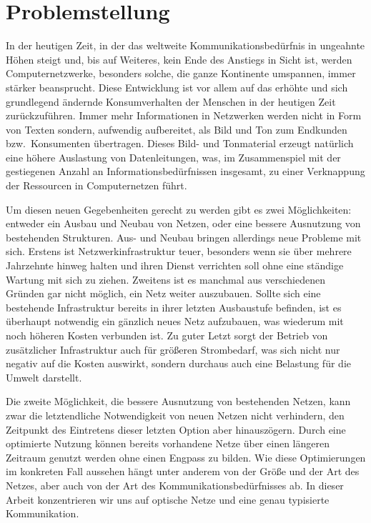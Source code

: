 \chapter{Problemstellung}
In der heutigen Zeit, in der das weltweite Kommunikationsbedürfnis in ungeahnte Höhen steigt und, bis auf Weiteres, kein Ende des Anstiegs in Sicht ist, werden Computernetzwerke, besonders solche, die ganze Kontinente umspannen, immer stärker beansprucht. Diese Entwicklung ist vor allem auf das erhöhte und sich grundlegend ändernde Konsumverhalten der Menschen in der heutigen Zeit zurückzuführen. Immer mehr Informationen in Netzwerken werden nicht in Form von Texten sondern, aufwendig aufbereitet, als Bild und Ton zum Endkunden bzw.\ Konsumenten übertragen. Dieses Bild- und Tonmaterial erzeugt natürlich eine höhere Auslastung von Datenleitungen, was, im Zusammenspiel mit der gestiegenen Anzahl an Informationsbedürfnissen insgesamt, zu einer Verknappung der Ressourcen in Computernetzen führt.

Um diesen neuen Gegebenheiten gerecht zu werden gibt es zwei Möglichkeiten: entweder ein Ausbau und Neubau von Netzen, oder eine bessere Ausnutzung von bestehenden Strukturen. Aus- und Neubau bringen allerdings neue Probleme mit sich. Erstens ist Netzwerkinfrastruktur teuer, besonders wenn sie über mehrere Jahrzehnte hinweg halten und ihren Dienst verrichten soll ohne eine ständige Wartung mit sich zu ziehen. Zweitens ist es manchmal aus verschiedenen Gründen gar nicht möglich, ein Netz weiter auszubauen. Sollte sich eine bestehende Infrastruktur bereits in ihrer letzten Ausbaustufe befinden, ist es überhaupt notwendig ein gänzlich neues Netz aufzubauen, was wiederum mit noch höheren Kosten verbunden ist. Zu guter Letzt sorgt der Betrieb von zusätzlicher Infrastruktur auch für größeren Strombedarf, was sich nicht nur negativ auf die Kosten auswirkt, sondern durchaus auch eine Belastung für die Umwelt darstellt.

Die zweite Möglichkeit, die bessere Ausnutzung von bestehenden Netzen, kann zwar die letzt\-endliche Notwendigkeit von neuen Netzen nicht verhindern, den Zeitpunkt des Eintretens dieser letzten Option aber hinauszögern. Durch eine optimierte Nutzung können bereits vorhandene Netze über einen längeren Zeitraum genutzt werden ohne einen Engpass zu bilden. Wie diese Optimierungen im konkreten Fall aussehen hängt unter anderem von der Größe und der Art des Netzes, aber auch von der Art des Kommunikationsbedürfnisses ab. In dieser Arbeit konzentrieren wir uns auf optische Netze und eine genau typisierte Kommunikation.

